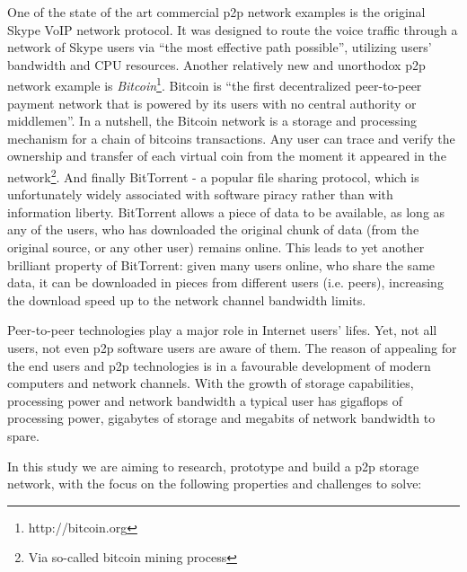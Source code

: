 One of the state of the art commercial p2p network examples is the
original Skype VoIP network protocol. It was designed to route the
voice traffic through a network of Skype users via
``the most effective path possible''\cite{skype-p2p}, utilizing
users' bandwidth and CPU resources.
Another relatively new and unorthodox p2p network example is
\emph{Bitcoin}\footnote{http://bitcoin.org}. Bitcoin is
``the first decentralized peer-to-peer payment network that
is powered by its users with no central authority or middlemen''.
In a nutshell, the Bitcoin network is a storage and processing
mechanism for a chain of bitcoins transactions. Any user can
trace and verify the ownership and transfer of each virtual
coin from the moment it appeared in the network\footnote{Via
so-called bitcoin mining process}.
And finally BitTorrent - a popular file sharing protocol, which is
unfortunately widely associated with software piracy rather than
with information liberty. BitTorrent allows a piece of data to be
available, as long as any of the users, who has downloaded the original
chunk of data (from the original source, or any other user) remains
online. This leads to yet another brilliant property of BitTorrent:
given many users online, who share the same data, it can be downloaded
in pieces from different users (i.e. peers), increasing the download
speed up to the network channel bandwidth limits.

Peer-to-peer technologies play a major role in Internet users' lifes.
Yet, not all users, not even p2p software users are aware of them.
The reason of appealing for the end users and p2p technologies
is in a favourable development of modern computers and network channels.
With the growth of storage capabilities, processing power and network
bandwidth a typical user has gigaflops of processing power, gigabytes
of storage and megabits of network bandwidth to spare.

In this study we are aiming to research, prototype and build a p2p storage
network, with the focus on the following properties and challenges to
solve:

